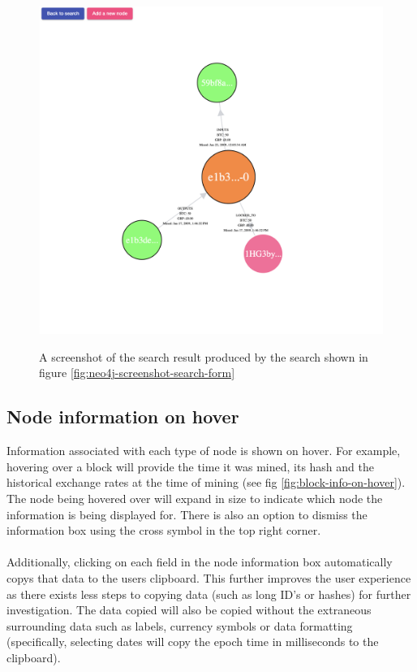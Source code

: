 \begin{figure}[h!]
  \centering
  \includegraphics[width = 15cm]{./figures/ui-screenshots/graph-basic}\\[0.5cm] 
  \caption{A screenshot of the search result produced by the search shown in figure \ref{fig:neo4j-screenshot-search-form}}
  \label{fig:neo4j-screenshot-basic-address-nodes}
\end{figure}

\subsection{Node information on hover}
Information associated with each type of node is shown on hover. For example, hovering over a block will provide the time it was mined, its hash and the historical exchange rates at the time of mining (see fig \ref{fig:block-info-on-hover}). The node being hovered over will expand in size to indicate which node the information is being displayed for. There is also an option to dismiss the information box using the cross symbol in the top right corner. 
\\\\
Additionally, clicking on each field in the node information box automatically copys that data to the users clipboard. This further improves the user experience as there exists less steps to copying data (such as long ID's or hashes) for further investigation. The data copied will also be copied without the extraneous surrounding data such as labels, currency symbols or data formatting (specifically, selecting dates will copy the epoch time in milliseconds to the clipboard). 

